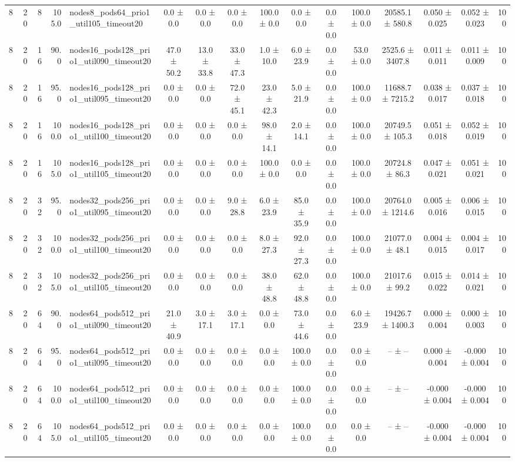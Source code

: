 \begin{tabular}{r r r r l c c c c c c c c c c r}
8 & 20 & 8 & 105.0 & nodes8\_pods64\_prio1\_util105\_timeout20 & 0.0 ± 0.0 & 0.0 ± 0.0 & 0.0 ± 0.0 & 100.0 ± 0.0 & 0.0 ± 0.0 & 0.0 ± 0.0 & 100.0 ± 0.0 & 20585.1 ± 580.8 & 0.050 ± 0.025 & 0.052 ± 0.023 & 100 \\
8 & 20 & 16 & 90.0 & nodes16\_pods128\_prio1\_util090\_timeout20 & 47.0 ± 50.2 & 13.0 ± 33.8 & 33.0 ± 47.3 & 1.0 ± 10.0 & 6.0 ± 23.9 & 0.0 ± 0.0 & 53.0 ± 0.0 & 2525.6 ± 3407.8 & 0.011 ± 0.011 & 0.011 ± 0.009 & 100 \\
8 & 20 & 16 & 95.0 & nodes16\_pods128\_prio1\_util095\_timeout20 & 0.0 ± 0.0 & 0.0 ± 0.0 & 72.0 ± 45.1 & 23.0 ± 42.3 & 5.0 ± 21.9 & 0.0 ± 0.0 & 100.0 ± 0.0 & 11688.7 ± 7215.2 & 0.038 ± 0.017 & 0.037 ± 0.018 & 100 \\
8 & 20 & 16 & 100.0 & nodes16\_pods128\_prio1\_util100\_timeout20 & 0.0 ± 0.0 & 0.0 ± 0.0 & 0.0 ± 0.0 & 98.0 ± 14.1 & 2.0 ± 14.1 & 0.0 ± 0.0 & 100.0 ± 0.0 & 20749.5 ± 105.3 & 0.051 ± 0.018 & 0.052 ± 0.019 & 100 \\
8 & 20 & 16 & 105.0 & nodes16\_pods128\_prio1\_util105\_timeout20 & 0.0 ± 0.0 & 0.0 ± 0.0 & 0.0 ± 0.0 & 100.0 ± 0.0 & 0.0 ± 0.0 & 0.0 ± 0.0 & 100.0 ± 0.0 & 20724.8 ± 86.3 & 0.047 ± 0.021 & 0.051 ± 0.021 & 100 \\
8 & 20 & 32 & 95.0 & nodes32\_pods256\_prio1\_util095\_timeout20 & 0.0 ± 0.0 & 0.0 ± 0.0 & 9.0 ± 28.8 & 6.0 ± 23.9 & 85.0 ± 35.9 & 0.0 ± 0.0 & 100.0 ± 0.0 & 20764.0 ± 1214.6 & 0.005 ± 0.016 & 0.006 ± 0.015 & 100 \\
8 & 20 & 32 & 100.0 & nodes32\_pods256\_prio1\_util100\_timeout20 & 0.0 ± 0.0 & 0.0 ± 0.0 & 0.0 ± 0.0 & 8.0 ± 27.3 & 92.0 ± 27.3 & 0.0 ± 0.0 & 100.0 ± 0.0 & 21077.0 ± 48.1 & 0.004 ± 0.015 & 0.004 ± 0.017 & 100 \\
8 & 20 & 32 & 105.0 & nodes32\_pods256\_prio1\_util105\_timeout20 & 0.0 ± 0.0 & 0.0 ± 0.0 & 0.0 ± 0.0 & 38.0 ± 48.8 & 62.0 ± 48.8 & 0.0 ± 0.0 & 100.0 ± 0.0 & 21017.6 ± 99.2 & 0.015 ± 0.022 & 0.014 ± 0.021 & 100 \\
8 & 20 & 64 & 90.0 & nodes64\_pods512\_prio1\_util090\_timeout20 & 21.0 ± 40.9 & 3.0 ± 17.1 & 3.0 ± 17.1 & 0.0 ± 0.0 & 73.0 ± 44.6 & 0.0 ± 0.0 & 6.0 ± 23.9 & 19426.7 ± 1400.3 & 0.000 ± 0.004 & 0.000 ± 0.003 & 100 \\
8 & 20 & 64 & 95.0 & nodes64\_pods512\_prio1\_util095\_timeout20 & 0.0 ± 0.0 & 0.0 ± 0.0 & 0.0 ± 0.0 & 0.0 ± 0.0 & 100.0 ± 0.0 & 0.0 ± 0.0 & 0.0 ± 0.0 & -- ± -- & 0.000 ± 0.004 & -0.000 ± 0.004 & 100 \\
8 & 20 & 64 & 100.0 & nodes64\_pods512\_prio1\_util100\_timeout20 & 0.0 ± 0.0 & 0.0 ± 0.0 & 0.0 ± 0.0 & 0.0 ± 0.0 & 100.0 ± 0.0 & 0.0 ± 0.0 & 0.0 ± 0.0 & -- ± -- & -0.000 ± 0.004 & -0.000 ± 0.004 & 100 \\
8 & 20 & 64 & 105.0 & nodes64\_pods512\_prio1\_util105\_timeout20 & 0.0 ± 0.0 & 0.0 ± 0.0 & 0.0 ± 0.0 & 0.0 ± 0.0 & 100.0 ± 0.0 & 0.0 ± 0.0 & 0.0 ± 0.0 & -- ± -- & -0.000 ± 0.004 & -0.000 ± 0.004 & 100 \\
\bottomrule
\end{tabular}
